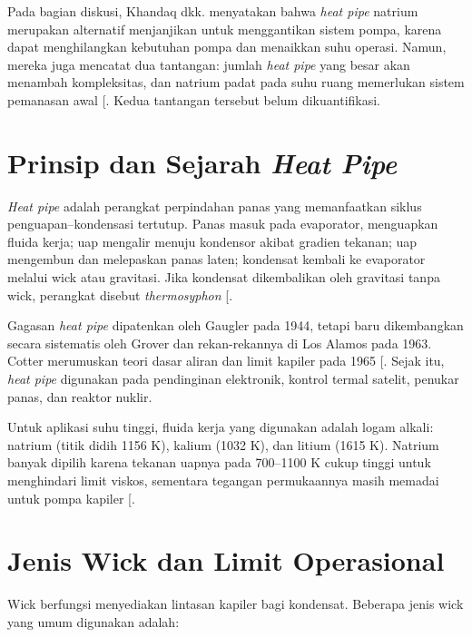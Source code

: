 \documentclass[
  indonesian,
  12pt,
  a4paper,
]{report}
\begin{document}
Pada bagian diskusi, Khandaq dkk. menyatakan bahwa \emph{heat pipe}
natrium merupakan alternatif menjanjikan untuk menggantikan sistem
pompa, karena dapat menghilangkan kebutuhan pompa dan menaikkan suhu
operasi. Namun, mereka juga mencatat dua tantangan: jumlah \emph{heat
pipe} yang besar akan menambah kompleksitas, dan natrium padat pada suhu
ruang memerlukan sistem pemanasan awal
{[}\citeproc{ref-khandaq2020}{7}{]}. Kedua tantangan tersebut belum
dikuantifikasi.

\section{\texorpdfstring{Prinsip dan Sejarah \emph{Heat
Pipe}}{Prinsip dan Sejarah Heat Pipe}}\label{prinsip-dan-sejarah-heat-pipe}

\emph{Heat pipe} adalah perangkat perpindahan panas yang memanfaatkan
siklus penguapan--kondensasi tertutup. Panas masuk pada evaporator,
menguapkan fluida kerja; uap mengalir menuju kondensor akibat gradien
tekanan; uap mengembun dan melepaskan panas laten; kondensat kembali ke
evaporator melalui wick atau gravitasi. Jika kondensat dikembalikan oleh
gravitasi tanpa wick, perangkat disebut \emph{thermosyphon}
{[}\citeproc{ref-dunn2006}{3}{]}.

Gagasan \emph{heat pipe} dipatenkan oleh Gaugler pada 1944, tetapi baru
dikembangkan secara sistematis oleh Grover dan rekan-rekannya di Los
Alamos pada 1963. Cotter merumuskan teori dasar aliran dan limit kapiler
pada 1965 {[}\citeproc{ref-cotter1965}{2}{]}. Sejak itu, \emph{heat
pipe} digunakan pada pendinginan elektronik, kontrol termal satelit,
penukar panas, dan reaktor nuklir.

Untuk aplikasi suhu tinggi, fluida kerja yang digunakan adalah logam
alkali: natrium (titik didih 1156 K), kalium (1032 K), dan litium (1615
K). Natrium banyak dipilih karena tekanan uapnya pada 700--1100 K cukup
tinggi untuk menghindari limit viskos, sementara tegangan permukaannya
masih memadai untuk pompa kapiler {[}\citeproc{ref-faghri1995}{11}{]}.

\section{Jenis Wick dan Limit
Operasional}\label{jenis-wick-dan-limit-operasional}

Wick berfungsi menyediakan lintasan kapiler bagi kondensat. Beberapa
jenis wick yang umum digunakan adalah:
\end{document}
